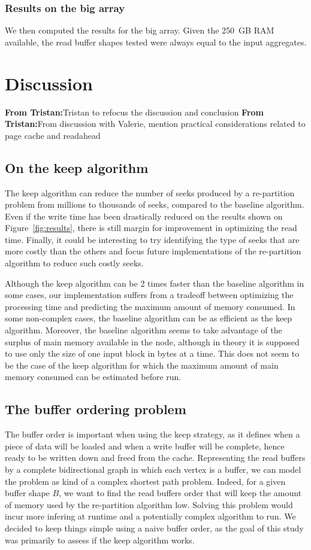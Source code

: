 \documentclass[sigconf, nonacm]{acmart}
\newcommand{\tristan}[1]{\color{orange}\textbf{From Tristan:}#1\color{black}}
\begin{document}
\subsubsection{Results on the big array}

We then computed the results for the big array.
Given the 250~GB RAM available, the read buffer shapes tested were always equal to
the input aggregates.

\section{Discussion}
\tristan{Tristan to refocus the discussion and conclusion}
\tristan{From discussion with Valerie, mention practical considerations related to page cache and readahead}

\subsection{On the keep algorithm}
The keep algorithm can reduce the number of seeks produced by a re-partition
problem from millions to thousands of seeks, compared to the baseline algorithm.
Even if the write time has been drastically reduced on the results shown on
Figure~\ref{fig:results}, there is still margin for improvement in optimizing
the read time.
Finally, it could be interesting to try identifying the type of seeks that are
more costly than the others and focus future implementations of the re-partition
algorithm to reduce such costly seeks.

Although the keep algorithm can be 2 times faster than the baseline algorithm
in some cases, our implementation suffers from a tradeoff between optimizing
the processing time and predicting the maximum amount of memory consumed.
In some non-complex cases, the baseline algorithm can be as efficient as the
keep algorithm.
Moreover, the baseline algorithm seems to take advantage of the surplus of
main memory available in the node, although in theory it is supposed to use
only the size of one input block in bytes at a time.
This does not seem to be the case of the keep algorithm for which the maximum
amount of main memory consumed can be estimated before run.

\subsection{The buffer ordering problem}
The buffer order is important when using the keep strategy, as it defines when
a piece of data will be loaded and when a write buffer will be complete, hence
ready to be written down and freed from the cache.
Representing the read buffers by a complete bidirectional graph in which each
vertex is a buffer, we can model the problem as kind of a complex shortest path
problem.
Indeed, for a given buffer shape $B$, we want to find the read buffers order
that will keep the amount of memory used by the re-partition algorithm low.
Solving this problem would incur more infering at runtime and a potentially
complex algorithm to run.
We decided to keep things simple using a naive buffer order, as the goal of
this study was primarily to assess if the keep algorithm works.
\end{document}
